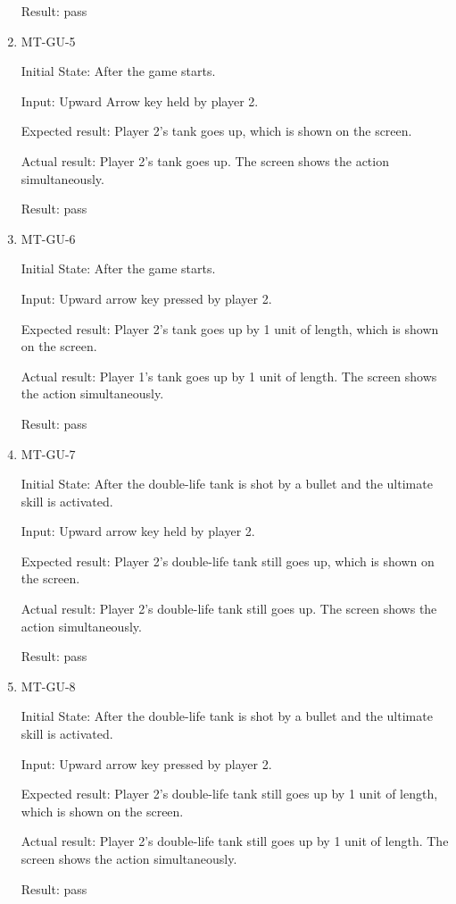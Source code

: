 \documentclass[12pt, titlepage]{article}
\begin{document}
\begin{enumerate}
Result: pass

\item{MT-GU-5\\}
					
Initial State: After the game starts.
					
Input: Upward Arrow key held by player 2.
					
Expected result: Player 2's tank goes up, which is shown on the screen.
					
Actual result: Player 2's tank goes up. The screen shows the action simultaneously. 
			
Result: pass

\item{MT-GU-6\\}
					
Initial State: After the game starts.
					
Input: Upward arrow key pressed by player 2.
					
Expected result: Player 2's tank goes up by 1 unit of length, which is shown on the screen.
					
Actual result: Player 1's tank goes up by 1 unit of length. The screen shows the action simultaneously.

Result: pass

\item{MT-GU-7\\}
					
Initial State: After the double-life tank is shot by a bullet and the ultimate skill is activated.
					
Input: Upward arrow key held by player 2.
					
Expected result: Player 2's double-life tank still goes up, which is shown on the screen.
					
Actual result: Player 2's double-life tank still goes up. The screen shows the action simultaneously.

Result: pass

\item{MT-GU-8\\}
					
Initial State: After the double-life tank is shot by a bullet and the ultimate skill is activated.
					
Input: Upward arrow key pressed by player 2.
					
Expected result: Player 2's double-life tank still goes up by 1 unit of length, which is shown on the screen.
					
Actual result: Player 2's double-life tank still goes up by 1 unit of length. The screen shows the action simultaneously.

Result: pass

\end{enumerate}
\end{document}
